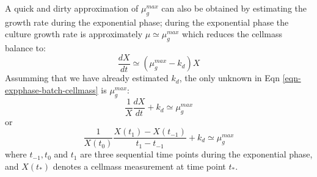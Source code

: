 \documentclass[11pt]{article}
\theoremstyle{definition}
\begin{document}
A quick and dirty approximation of $\mu_{g}^{max}$ can also be obtained by estimating the growth rate during the exponential phase; during the exponential phase the culture growth rate is approximately $\mu\simeq\mu_{g}^{max}$ which reduces
the cellmass balance to:
\begin{equation}\label{eqn-expphase-batch-cellmass}
	\frac{dX}{dt} \simeq \left(\mu_{g}^{max} - k_{d}\right)X
\end{equation}Assumming that we have already estimated $k_{d}$, the only unknown in Eqn \eqref{eqn-expphase-batch-cellmass} is $\mu_{g}^{max}$:
\begin{equation}
	\frac{1}{X}\frac{dX}{dt}+k_{d} \simeq \mu_{g}^{max}
\end{equation}or
\begin{equation}
	\frac{1}{X(t_{0})}\frac{X(t_1) - X(t_{-1})}{t_{1} - t_{-1}} + k_{d} \simeq \mu_{g}^{max}
\end{equation}where $t_{-1},t_{0}$ and $t_{1}$ are three sequential time points during the exponential phase, and $X(t_{*})$ denotes a cellmass measurement at time point $t_{*}$.



\end{document}
